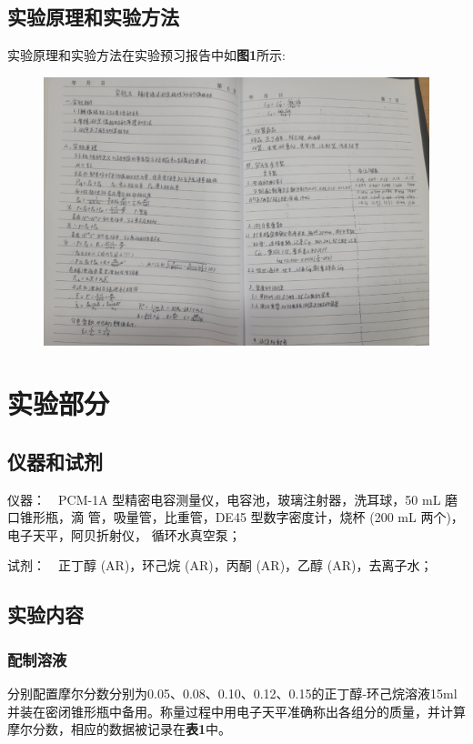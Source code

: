 \documentclass[12pt]{article}
\begin{document}
			\subsection{实验原理和实验方法}
				实验原理和实验方法在实验预习报告中如\textbf{图1}所示: \par
		\begin{figure}[h]
			\centering
			\includegraphics[width=1.0\textwidth]{1.png}
		\end{figure}


               
	\vbox{} %
	     
    \section{实验部分}
    	\subsection{仪器和试剂}
    		仪器：\ \  PCM-1A 型精密电容测量仪，电容池，玻璃注射器，洗耳球，50 mL 磨口锥形瓶，滴
			管，吸量管，比重管，DE45 型数字密度计，烧杯 (200 mL 两个)，电子天平，阿贝折射仪，
			循环水真空泵；\par
			试剂：\ \  正丁醇 (AR)，环己烷 (AR)，丙酮 (AR)，乙醇 (AR)，去离子水；\par
    	\par
    	 \subsection{实验内容}
			\subsubsection{配制溶液}
				分别配置摩尔分数分别为0.05、0.08、0.10、0.12、0.15的正丁醇-环己烷溶液15ml并装在密闭锥形瓶中备用。称量过程中用电子天平准确称出各组分的质量，并计算摩尔分数，相应的数据被记录在\textbf{表1}中。
\end{document}
